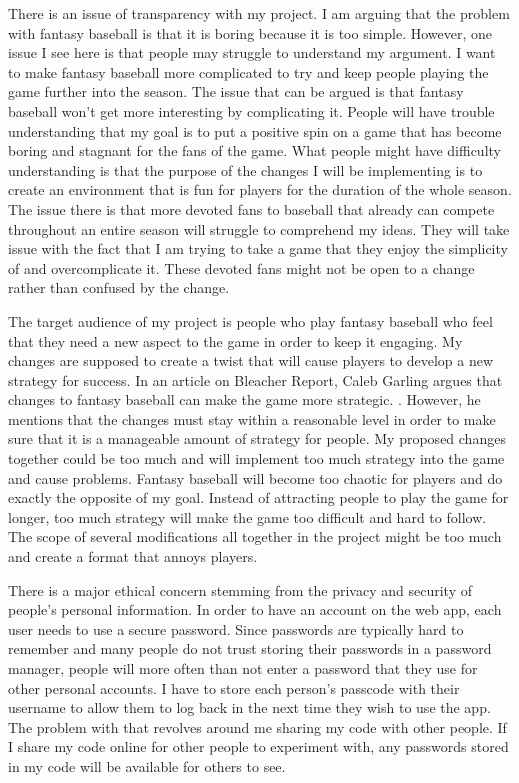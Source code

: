 \documentclass[12pt, twocolumn]{article}
\begin{document}
There is an issue of transparency with my project. I am arguing that the problem with fantasy baseball is that it is boring because it is too simple. However, one issue I see here is that people may struggle to understand my argument. I want to make fantasy baseball more complicated to try and keep people playing the game further into the season. The issue that can be argued is that fantasy baseball won't get more interesting by complicating it. People will have trouble understanding that my goal is to put a positive spin on a game that has become boring and stagnant for the fans of the game. What people might have difficulty understanding is that the purpose of the changes I will be implementing is to create an environment that is fun for players for the duration of the whole season. The issue there is that more devoted fans to baseball that already can compete throughout an entire season will struggle to comprehend my ideas. They will take issue with the fact that I am trying to take a game that they enjoy the simplicity of and overcomplicate it. These devoted fans might not be open to a change rather than confused by the change. 

The target audience of my project is people who play fantasy baseball who feel that they need a new aspect to the game in order to keep it engaging. My changes are supposed to create a twist that will cause players to develop a new strategy for success. In an article on Bleacher Report, Caleb Garling argues that changes to fantasy baseball can make the game more strategic. \cite{Garling}. However, he mentions that the changes must stay within a reasonable level in order to make sure that it is a manageable amount of strategy for people. My proposed changes together could be too much and will implement too much strategy into the game and cause problems. Fantasy baseball will become too chaotic for players and do exactly the opposite of my goal. Instead of attracting people to play the game for longer, too much strategy will make the game too difficult and hard to follow. The scope of several modifications all together in the project might be too much and create a format that annoys players. 

There is a major ethical concern stemming from the privacy and security of people's personal information. In order to have an account on the web app, each user needs to use a secure password. Since passwords are typically hard to remember and many people do not trust storing their passwords in a password manager, people will more often than not enter a password that they use for other personal accounts. I have to store each person's passcode with their username to allow them to log back in the next time they wish to use the app. The problem with that revolves around me sharing my code with other people. If I share my code online for other people to experiment with, any passwords stored in my code will be available for others to see.
\end{document}
